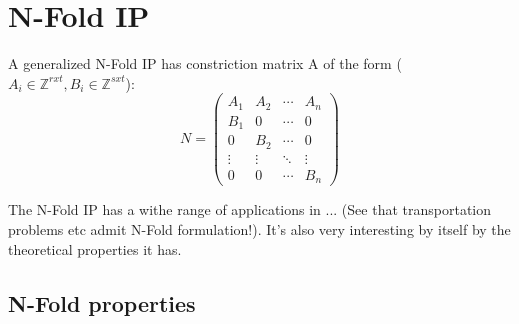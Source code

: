 \chapter{N-Fold IP} \label{methodology}




A generalized N-Fold IP has constriction matrix A of the form ($A_i \in \mathbb{Z}^{rxt}, B_i \in \mathbb{Z}^{sxt}$):\\
\begin{equation*}
N = 
\begin{pmatrix}
A_1 & A_2 & \cdots & A_n \\
B_1 & 0   & \cdots & 0 \\
0   & B_2 & \cdots & 0 \\
\vdots    & \vdots & \ddots & \vdots  \\
0   & 0   & \cdots & B_n 
\end{pmatrix}
\end{equation*}






The N-Fold IP has a withe range of applications in ... (See that transportation problems etc admit N-Fold formulation!). It's also very interesting by itself by the theoretical properties it has.

\section{N-Fold properties}

